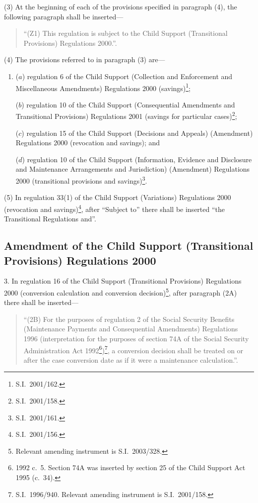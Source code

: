 \documentclass[12pt,a4paper]{article}
\begin{document}
(3) At the beginning of each of the provisions specified in paragraph (4), the following paragraph shall be inserted—
\begin{quotation}
“(Z1) This regulation is subject to the Child Support (Transitional Provisions) Regulations 2000.”.
\end{quotation}

(4) The provisions referred to in paragraph (3) are—
\begin{enumerate}\item[]
($a$) regulation 6 of the Child Support (Collection and Enforcement and Miscellaneous Amendments) Regulations 2000 (savings)\footnote{S.I.\ 2001/162.};

($b$) regulation 10 of the Child Support (Consequential Amendments and Transitional Provisions) Regulations 2001 (savings for particular cases)\footnote{S.I.\ 2001/158.};

($c$) regulation 15 of the Child Support (Decisions and Appeals) (Amendment) Regulations 2000 (revocation and savings); and

($d$) regulation 10 of the Child Support (Information, Evidence and Disclosure and Maintenance Arrangements and Jurisdiction) (Amendment) Regulations 2000 (transitional provisions and savings)\footnote{S.I.\ 2001/161.}.
\end{enumerate}

(5) In regulation 33(1) of the Child Support (Variations) Regulations 2000 (revocation and savings)\footnote{S.I.\ 2001/156.}, after “Subject to” there shall be inserted “the Transitional Regulations and”.

\subsection[3. Amendment of the Child Support (Transitional Provisions) Regulations 2000]{Amendment of the Child Support (Transitional Provisions) Regulations 2000}

3.  In regulation 16 of the Child Support (Transitional Provisions) Regulations 2000 (conversion calculation and conversion decision)\footnote{Relevant amending instrument is S.I.\ 2003/328.}, after paragraph (2A) there shall be inserted—
\begin{quotation}
“(2B) For the purposes of regulation 2 of the Social Security Benefits (Maintenance Payments and Consequential Amendments) Regulations 1996 (interpretation for the purposes of section 74A of the Social Security Administration Act 1992\footnote{1992 c.\ 5. Section 74A was inserted by section 25 of the Child Support Act 1995 (c.\ 34).})\footnote{S.I.\ 1996/940. Relevant amending instrument is S.I.\ 2001/158.}, a conversion decision shall be treated on or after the case conversion date as if it were a maintenance calculation.”.
\end{quotation}
\end{document}
